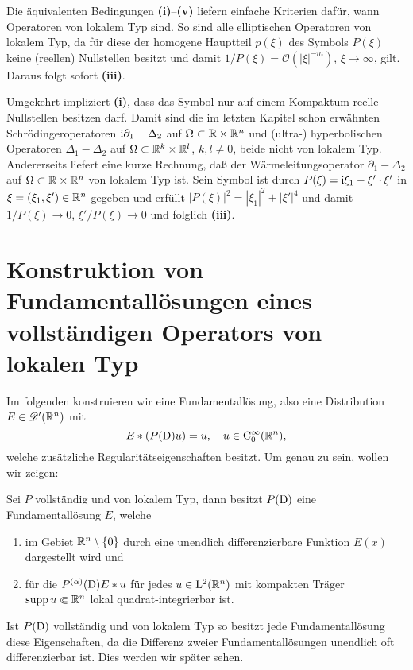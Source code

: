 \begin{exa}
Die äquivalenten Bedingungen  {\bf (i)}--{\bf(v)} liefern einfache Kriterien dafür, wann Operatoren von lokalem Typ sind. So sind alle elliptischen Operatoren von lokalem Typ, da für diese der homogene Hauptteil $p(\xi)$ des Symbols $P(\xi)$ keine (reellen) Nullstellen besitzt und damit $1/P(\xi) = \mathcal O(|\xi|^{-m})$, $\xi\to\infty$, gilt. Daraus folgt sofort {\bf (iii)}. 

Umgekehrt impliziert {\bf (i)}, dass das Symbol nur auf einem Kompaktum reelle Nullstellen besitzen darf. Damit sind die im letzten Kapitel schon erwähnten 
Schrödingeroperatoren $\mathrm i\partial_1-\Delta_2$ auf $\Omega\subset \mathbb R\times\mathbb R^n$ und (ultra-) hyperbolischen Operatoren $\Delta_1-\Delta_2$ auf $\Omega\subset \mathbb R^k\times\mathbb R^l$, $k,l\ne0$, beide nicht von lokalem Typ. Andererseits liefert eine kurze Rechnung, daß der Wärmeleitungsoperator $\partial_1-\Delta_2$ auf $\Omega\subset\mathbb R\times\mathbb R^n$ von lokalem Typ ist. Sein Symbol ist durch $P(\xi) = \mathrm i \xi_1 - \xi'\cdot\xi'$ in $\xi=(\xi_1,\xi')\in\mathbb R^n$ gegeben und erfüllt $|P(\xi)|^2 = |\xi_1|^2+|\xi'|^4$ und damit $1/P(\xi)\to0$, $\xi' / P(\xi)\to0$ und folglich {\bf (iii)}.
\end{exa}

\section{Konstruktion von Fundamentallösungen eines vollständigen Operators von lokalen Typ} %

Im folgenden konstruieren wir eine Fundamentallösung, also eine Distribution $E\in\mathscr D'(\mathbb R^n)$ mit
\begin{equation}
E*(P(\mathrm D) u) = u, \quad u \in \mathrm C_0^\infty(\mathbb R^n),
\end{equation}
welche zusätzliche Regularitätseigenschaften besitzt.
Um genau zu sein,  wollen wir zeigen:
\begin{thm}\label{fundamental_exist}
Sei $P$ vollständig und von lokalem Typ, dann besitzt $P(\mathrm D)$ eine Fundamentallösung $E$, welche 
\begin{enumerate}
\item im Gebiet $\mathbb R^n\setminus\{0\}$  durch eine unendlich differenzierbare Funktion $E(x)$ dargestellt wird und
\item für die $P^{(\alpha)}(\mathrm D) E*u$ für jedes $u\in \mathrm L^2(\mathbb R^n)$ mit kompakten Träger $\operatorname{supp} u\Subset\mathbb R^n$ lokal quadrat-integrierbar ist. 
\end{enumerate}
\end{thm}
\begin{rem}
Ist $P(\mathrm D)$ vollständig und von lokalem Typ so besitzt jede Fundamentallösung diese Eigenschaften, da die Differenz zweier Fundamentallösungen unendlich oft differenzierbar ist. Dies werden wir später sehen.
\end{rem}

